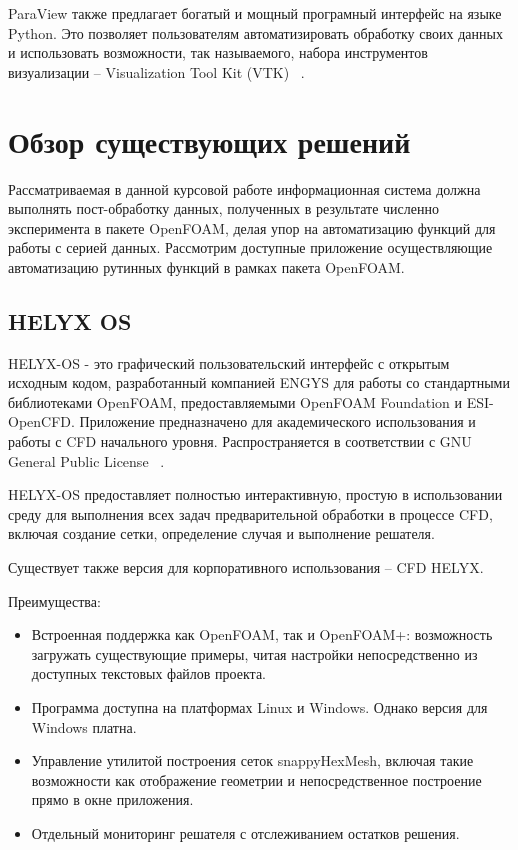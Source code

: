 \documentclass[14pt]{extreport}
\begin{document}
ParaView также предлагает богатый и мощный програмный интерфейс на языке Python. Это позволяет пользователям автоматизировать обработку своих данных и использовать возможности, так называемого, набора инструментов визуализации -- Visualization Tool Kit (VTK) ~\cite{ParaviewAndPython}.

\chapter{Обзор существующих решений}
Рассматриваемая в данной курсовой работе информационная система должна выполнять пост-обработку данных, полученных в результате численно эксперимента в пакете OpenFOAM, делая упор на автоматизацию функций для работы с серией данных. Рассмотрим доступные приложение осуществляющие автоматизацию рутинных функций в рамках пакета OpenFOAM.
\section{HELYX OS}
HELYX-OS - это графический пользовательский интерфейс с открытым исходным кодом, разработанный компанией ENGYS для работы со стандартными библиотеками OpenFOAM, предоставляемыми OpenFOAM Foundation и ESI-OpenCFD. Приложение предназначено для академического использования и работы с CFD начального уровня. Распространяется в соответствии с GNU General Public License ~\cite{Helyx}.

HELYX-OS предоставляет полностью интерактивную, простую в использовании среду для выполнения всех задач предварительной обработки в процессе CFD, включая создание сетки, определение случая и выполнение решателя.

Существует также версия для корпоративного использования -- CFD HELYX.

Преимущества: 
\begin{itemize}
\item Встроенная поддержка как OpenFOAM, так и OpenFOAM+: возможность загружать существующие примеры, читая настройки непосредственно из доступных текстовых файлов проекта.
\item Программа доступна на платформах Linux и Windows. Однако версия для Windows платна.
\item Управление утилитой построения сеток snappyHexMesh, включая такие возможности как отображение геометрии и непосредственное построение прямо в окне приложения.
\item Отдельный мониторинг решателя с отслеживанием остатков решения.
\end{itemize}
\end{document}
